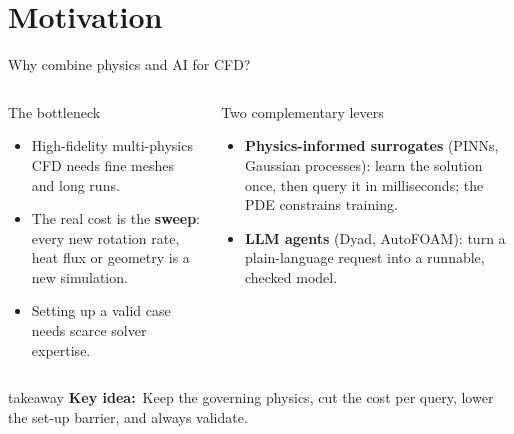\documentclass[aspectratio=169,10pt,t]{beamer}
\newcommand{\key}[1]{\textcolor{qblue}{\textbf{#1}}}
\newcommand{\takeaway}[1]{%
  \par\vfill
  \begin{beamercolorbox}[wd=\linewidth,sep=5pt,rounded=true]{takeaway}
    \small\textcolor{qblue}{\textbf{Key idea:}}~#1
  \end{beamercolorbox}\vspace{1mm}}
\begin{document}
\section{Motivation}
\begin{frame}{Why combine physics and AI for CFD?}
\begin{columns}[T,onlytextwidth]
\begin{block}{The bottleneck}
\begin{itemize}\small
  \item High-fidelity multi-physics CFD needs fine meshes and long runs.
  \item The real cost is the \key{sweep}: every new rotation rate, heat flux or geometry is a new simulation.
  \item Setting up a valid case needs scarce solver expertise.
\end{itemize}
\end{block}
\begin{block}{Two complementary levers}
\begin{itemize}\small
  \item \key{Physics-informed surrogates} (PINNs, Gaussian processes): learn the solution once, then query it in milliseconds; the PDE constrains training.
  \item \key{LLM agents} (Dyad, AutoFOAM): turn a plain-language request into a runnable, checked model.
\end{itemize}
\end{block}
\end{columns}
\vspace{3mm}
\centering
{}
\takeaway{Keep the governing physics, cut the cost per query, lower the set-up barrier, and always validate.}
\end{frame}
\end{document}
